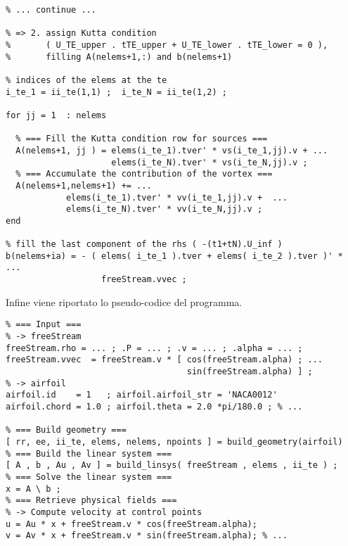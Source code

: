 \begin{tcolorbox}
\begin{verbatim}
% ... continue ...

% => 2. assign Kutta condition
%       ( U_TE_upper . tTE_upper + U_TE_lower . tTE_lower = 0 ),
%       filling A(nelems+1,:) and b(nelems+1)

% indices of the elems at the te
i_te_1 = ii_te(1,1) ;  i_te_N = ii_te(1,2) ;

for jj = 1  : nelems

  % === Fill the Kutta condition row for sources ===
  A(nelems+1, jj ) = elems(i_te_1).tver' * vs(i_te_1,jj).v + ...
                     elems(i_te_N).tver' * vs(i_te_N,jj).v ;
  % === Accumulate the contribution of the vortex ===
  A(nelems+1,nelems+1) += ...
            elems(i_te_1).tver' * vv(i_te_1,jj).v +  ...
            elems(i_te_N).tver' * vv(i_te_N,jj).v ; 
end

% fill the last component of the rhs ( -(t1+tN).U_inf )
b(nelems+ia) = - ( elems( i_te_1 ).tver + elems( i_te_2 ).tver )' * ...
                   freeStream.vvec ;
\end{verbatim}
\end{tcolorbox}

\vspace{1.0cm}
\noindent
Infine viene riportato lo pseudo-codice del programma.
\begin{tcolorbox}
\begin{verbatim}
% === Input ===
% -> freeStream
freeStream.rho = ... ; .P = ... ; .v = ... ; .alpha = ... ;
freeStream.vvec  = freeStream.v * [ cos(freeStream.alpha) ; ...
                                    sin(freeStream.alpha) ] ;
% -> airfoil
airfoil.id    = 1   ; airfoil.airfoil_str = 'NACA0012'
airfoil.chord = 1.0 ; airfoil.theta = 2.0 *pi/180.0 ; % ...

% === Build geometry ===
[ rr, ee, ii_te, elems, nelems, npoints ] = build_geometry(airfoil)
% === Build the linear system ===
[ A , b , Au , Av ] = build_linsys( freeStream , elems , ii_te ) ;
% === Solve the linear system ===
x = A \ b ;
% === Retrieve physical fields ===
% -> Compute velocity at control points
u = Au * x + freeStream.v * cos(freeStream.alpha);
v = Av * x + freeStream.v * sin(freeStream.alpha); % ...
\end{verbatim}
\end{tcolorbox}

\newpage



